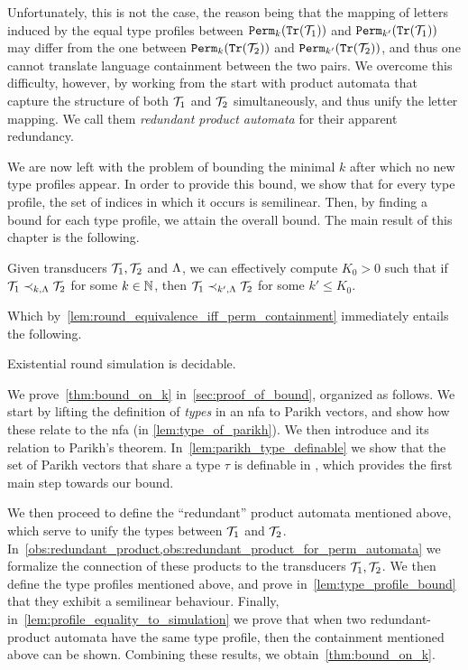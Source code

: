 Unfortunately, this is not the case, the reason being
that the mapping of letters induced by the equal type profiles between ${\mathtt{Perm}}_k({\mathtt{Tr}}(\mathcal{T}_1))$ and ${\mathtt{Perm}}_{k'}({\mathtt{Tr}}(\mathcal{T}_1))$ may differ from the one between ${\mathtt{Perm}}_k({\mathtt{Tr}}(\mathcal{T}_2))$ and ${\mathtt{Perm}}_{k'}({\mathtt{Tr}}(\mathcal{T}_2))$, and thus one cannot translate language containment between the two pairs. We overcome this difficulty, however, by working from the start with product automata that capture the structure of both $\mathcal{T}_1$ and $\mathcal{T}_2$ simultaneously, and thus unify the letter mapping. We call them \emph{redundant product automata} for their apparent redundancy. 

We are now left with the problem of bounding the minimal $k$ after which 
no new type profiles appear.
In order to provide this bound, we show that for every type profile, the set of indices in which it occurs is semilinear. Then, by finding a bound for each type profile, we attain the overall bound. 
The main result of this chapter is the following.
\begin{theorem}
\label{thm:bound_on_k}	
	Given transducers $\mathcal{T}_1,\mathcal{T}_2$ and $\Lambda$, we can effectively compute $K_0>0$ such that if $\mathcal{T}_1\prec_{k,\Lambda} \mathcal{T}_2$ for some $k\in \mathbb{N}$, then $\mathcal{T}_1\prec_{k',\Lambda} \mathcal{T}_2$ for some $k'\le K_0$.
\end{theorem}
Which by~\cref{lem:round_equivalence_iff_perm_containment} immediately entails the following.
\begin{corollary}
\label{cor:exist_k_decidable}
Existential round simulation is decidable.
\end{corollary}

We prove~\cref{thm:bound_on_k} in~\cref{sec:proof_of_bound}, organized as follows. We start by lifting the definition of \emph{types} in an \gls{nfa} to Parikh vectors, and show how these relate to the \gls{nfa} (in \cref{lem:type_of_parikh}). We then introduce  and its relation to Parikh's theorem. In~\cref{lem:parikh_type_definable} we show that the set of Parikh vectors that share a type $\tau$ is definable in , which provides the first main step towards our bound.

We then proceed to define the ``redundant'' product automata mentioned above, which serve to unify the types between $\mathcal{T}_1$ and $\mathcal{T}_2$. In~\cref{obs:redundant_product,obs:redundant_product_for_perm_automata} we formalize the connection of these products to the transducers $\mathcal{T}_1,\mathcal{T}_2$. We then define the type profiles mentioned above, and prove in~\cref{lem:type_profile_bound} that they exhibit a semilinear behaviour. Finally, in~\cref{lem:profile_equality_to_simulation} we prove that when two redundant-product automata have the same type profile, then the containment mentioned above can be shown. Combining these results, we obtain~\cref{thm:bound_on_k}.

